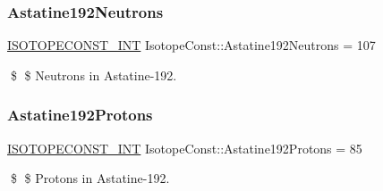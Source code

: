 \subsubsection{\texorpdfstring{Astatine192\+Neutrons}{Astatine192Neutrons}}
{\footnotesize\ttfamily \mbox{\hyperlink{group___isotope_const-_macros_ga5f18360b3e99483a35c32d789e62621c}{I\+S\+O\+T\+O\+P\+E\+C\+O\+N\+S\+T\+\_\+\+I\+NT}} Isotope\+Const\+::\+Astatine192\+Neutrons = 107}

\$ \$ Neutrons in Astatine-\/192. \mbox{\label{group___isotope_const-_astatine-_at192_ga57aa26437bba584be81f94f541c949b1}} 
\subsubsection{\texorpdfstring{Astatine192\+Protons}{Astatine192Protons}}
{\footnotesize\ttfamily \mbox{\hyperlink{group___isotope_const-_macros_ga5f18360b3e99483a35c32d789e62621c}{I\+S\+O\+T\+O\+P\+E\+C\+O\+N\+S\+T\+\_\+\+I\+NT}} Isotope\+Const\+::\+Astatine192\+Protons = 85}

\$ \$ Protons in Astatine-\/192. 